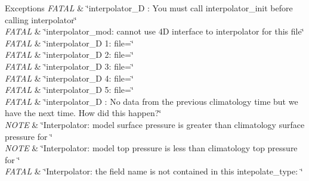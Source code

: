 \begin{DoxyExceptions}{Exceptions}
{\em F\+A\+T\+AL} & \char`\"{}interpolator\+\_\+D \+: You must call interpolator\+\_\+init
                before calling interpolator\char`\"{} \\
\hline
{\em F\+A\+T\+AL} & \char`\"{}interpolator\+\_\+mod\+: cannot use 4\+D interface to interpolator for this file\char`\"{} \\
\hline
{\em F\+A\+T\+AL} & \char`\"{}interpolator\+\_\+D 1\+:  file=\char`\"{} \\
\hline
{\em F\+A\+T\+AL} & \char`\"{}interpolator\+\_\+D 2\+:  file=\char`\"{} \\
\hline
{\em F\+A\+T\+AL} & \char`\"{}interpolator\+\_\+D 3\+:  file=\char`\"{} \\
\hline
{\em F\+A\+T\+AL} & \char`\"{}interpolator\+\_\+D 4\+:  file=\char`\"{} \\
\hline
{\em F\+A\+T\+AL} & \char`\"{}interpolator\+\_\+D 5\+:  file=\char`\"{} \\
\hline
{\em F\+A\+T\+AL} & \char`\"{}interpolator\+\_\+D \+: No data from the previous climatology
                time but we have the next time. How did this happen?\char`\"{} \\
\hline
{\em N\+O\+TE} & \char`\"{}\+Interpolator\+: model surface pressure is greater than
              climatology surface pressure for \char`\"{} \\
\hline
{\em N\+O\+TE} & \char`\"{}\+Interpolator\+: model top pressure is less than
                climatology top pressure for \char`\"{} \\
\hline
{\em F\+A\+T\+AL} & \char`\"{}\+Interpolator\+: the field name is not contained in this
                intepolate\+\_\+type\+: \char`\"{} \\
\hline
\end{DoxyExceptions}
\mbox{\label{namespaceinterpolator__mod_afe3e54b412fafba9458282b5982be15a}} 
